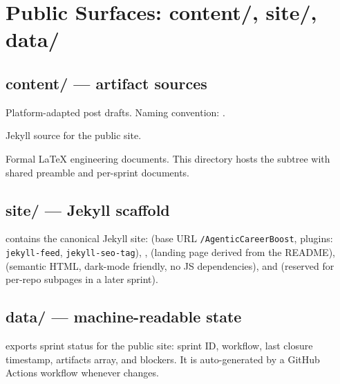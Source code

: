 \documentclass[a4paper,11pt,openany]{report}
\begin{document}
\chapter{Public Surfaces: content/, site/, data/}
\label{ch:surfaces}


\section{content/ --- artifact sources}

\begin{description}[style=nextline]
  \item[\pathref{content/social/}] Platform-adapted post drafts. Naming
    convention: .
  \item[\pathref{site/}] Jekyll source for the public site.
  \item[\pathref{agents/reports/}] Formal \LaTeX{} engineering documents.
    This directory hosts the  subtree with shared preamble and
    per-sprint documents.
\end{description}

\section{site/ --- Jekyll scaffold}

 contains the canonical Jekyll site: 
(base URL \texttt{/AgenticCareerBoost}, plugins: \texttt{jekyll-feed},
\texttt{jekyll-seo-tag}), ,  (landing page
derived from the README),  (semantic HTML, dark-mode
friendly, no JS dependencies), and  (reserved for
per-repo subpages in a later sprint).

\section{data/ --- machine-readable state}

 exports sprint status for the public site:
sprint ID, workflow, last closure timestamp, artifacts array, and blockers.
It is auto-generated by a GitHub Actions workflow whenever 
changes.
\end{document}
